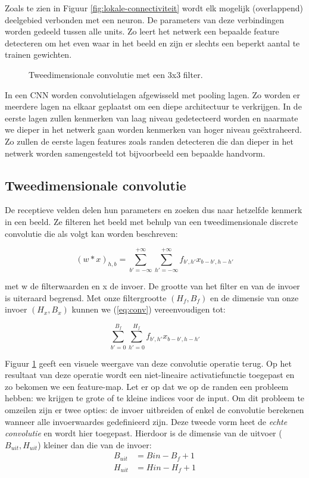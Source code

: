 \npar Zoals te zien in Figuur \ref{fig:lokale-connectiviteit} wordt elk mogelijk (overlappend) deelgebied verbonden met een neuron. De parameters van deze verbindingen worden gedeeld tussen alle units. Zo leert het netwerk een bepaalde feature detecteren om het even waar in het beeld en zijn er slechts een beperkt aantal te trainen gewichten.
 \begin{figure}[!t]
 	\centering
 	\def\svgwidth{0.55\columnwidth}
 	
 	\caption{Tweedimensionale convolutie met een 3x3 filter.}
 	\label{fig:conv}
 \end{figure}
\npar In een CNN worden convolutielagen afgewisseld met pooling lagen. Zo worden er meerdere lagen na elkaar geplaatst om een diepe architectuur te verkrijgen. In de eerste lagen zullen kenmerken van laag niveau gedetecteerd worden en naarmate we dieper in het netwerk gaan worden kenmerken van hoger niveau ge\"extraheerd. Zo zullen de eerste lagen features zoals randen detecteren die dan dieper in het netwerk worden samengesteld tot bijvoorbeeld een bepaalde handvorm.

\subsection{Tweedimensionale convolutie}

De receptieve velden delen hun parameters en zoeken dus naar hetzelfde kenmerk in een beeld. Ze filteren het beeld met behulp van een tweedimensionale discrete convolutie die als volgt kan worden beschreven:

\begin{equation}\label{eq:conv}
(w * x)_{h,b} = \sum_{b'=-\infty}^{+\infty}\sum_{h'=-\infty}^{+\infty} f_{b',h'}x_{b-b',h-h'}
\end{equation}

\npar met w de filterwaarden en x de invoer. De grootte van het filter en van de invoer is uiteraard begrensd. Met onze filtergrootte $(H_f,B_f)$ en de dimensie van onze invoer $(H_x,B_x)$ kunnen we (\ref{eq:conv}) vereenvoudigen tot:

\begin{equation}
\sum_{b'=0}^{B_f}\sum_{h'=0}^{H_f} f_{b',h'}x_{b-b',h-h'}
\end{equation}

\npar Figuur \ref{fig:conv} geeft een visuele weergave van deze convolutie operatie terug. Op het resultaat van deze operatie wordt een niet-lineaire activatiefunctie toegepast en zo bekomen we een feature-map. Let er op dat we op de randen een probleem hebben: we krijgen te grote of te kleine indices voor de input. Om dit probleem te omzeilen zijn er twee opties: de invoer uitbreiden of enkel de convolutie berekenen wanneer alle invoerwaardes gedefinieerd zijn. Deze tweede vorm heet de \textit{echte convolutie} en wordt hier toegepast. Hierdoor is de dimensie van de uitvoer ($B_{uit},H_{uit}$) kleiner dan die van de invoer:
\begin{equation}
\begin{aligned}
B_{uit}&=B{in}-B_f+1 \\
H_{uit}&=H{in}-H_f+1
\end{aligned}
\end{equation}

